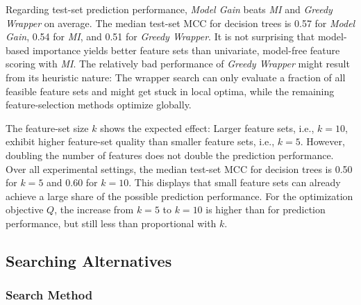 \documentclass[conference]{IEEEtran}
\theoremstyle{definition}
\begin{document}
Regarding test-set prediction performance, \emph{Model Gain} beats \emph{MI} and \emph{Greedy Wrapper} on average.
The median test-set MCC for decision trees is 0.57 for \emph{Model Gain}, 0.54 for \emph{MI}, and 0.51 for \emph{Greedy Wrapper}.
It is not surprising that model-based importance yields better feature sets than univariate, model-free feature scoring with \emph{MI}.
The relatively bad performance of \emph{Greedy Wrapper} might result from its heuristic nature:
The wrapper search can only evaluate a fraction of all feasible feature sets and might get stuck in local optima, while the remaining feature-selection methods optimize globally.

The feature-set size $k$ shows the expected effect:
Larger feature sets, i.e., $k=10$, exhibit higher feature-set quality than smaller feature sets, i.e., $k=5$.
However, doubling the number of features does not double the prediction performance.
Over all experimental settings, the median test-set MCC for decision trees is 0.50 for $k=5$ and 0.60 for $k=10$.
This displays that small feature sets can already achieve a large share of the possible prediction performance.
For the optimization objective $Q$, the increase from $k=5$ to $k=10$ is higher than for prediction performance, but still less than proportional with $k$.

\subsection{Searching Alternatives}

\subsubsection{Search Method}
\end{document}
